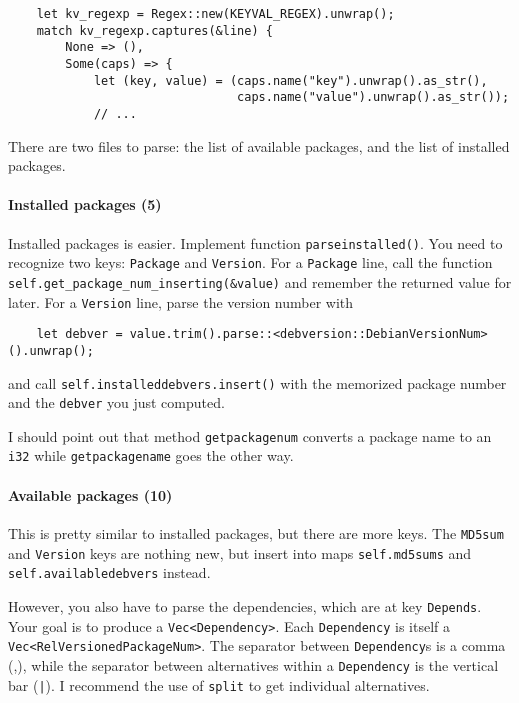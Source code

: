\documentclass[12pt]{article}
\renewcommand{\_}{\kern-1.5pt\textunderscore\kern-1.5pt}
\begin{document}
\begin{verbatim}
    let kv_regexp = Regex::new(KEYVAL_REGEX).unwrap();
    match kv_regexp.captures(&line) {
        None => (),
        Some(caps) => {
            let (key, value) = (caps.name("key").unwrap().as_str(), 
                                caps.name("value").unwrap().as_str());
            // ...
\end{verbatim}

\vspace{1em}
There are two files to parse: the list of available packages, and the list of installed packages. 

\paragraph{Installed packages (5)} Installed packages is easier. Implement function \texttt{parse\_installed()}.
You need to recognize two keys: \texttt{Package} and \texttt{Version}. For a \texttt{Package} line, call 
the function \verb+self.get_package_num_inserting(&value)+ and remember the returned value for later. For a \texttt{Version} line,
parse the version number with
\begin{verbatim}
    let debver = value.trim().parse::<debversion::DebianVersionNum>().unwrap();
\end{verbatim}
and call \texttt{self.installed\_debvers.insert()} with the memorized package number and the \texttt{debver} you just computed.\par

I should point out that method \texttt{get\_package\_num} converts a package name to an \texttt{i32} while
\texttt{get\_package\_name} goes the other way.

\paragraph{Available packages (10)} This is pretty similar to installed packages, but there are more keys. 
The \texttt{MD5sum} and \texttt{Version} keys are nothing new, but insert into maps \texttt{self.md5sums} and \texttt{self.available\_debvers} instead.\par

\vspace{1em}
However, you also have to parse the dependencies, which are at key \texttt{Depends}. Your goal is to produce a \verb+Vec<Dependency>+.
Each \texttt{Dependency} is itself a \verb+Vec<RelVersionedPackageNum>+. The separator between
\texttt{Dependency}s is a comma (,), while the separator between alternatives within a \texttt{Dependency} is
the vertical bar (\texttt{|}). I recommend the use of \texttt{split} to get individual alternatives.\par
\end{document}
